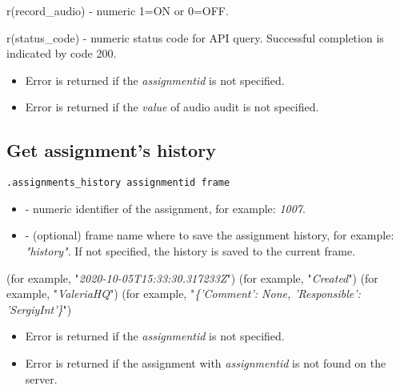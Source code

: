 \savedres
\begin{compactitem}
    \item r(record\_audio) - numeric 1=ON or 0=OFF.
    \item r(status\_code)  - numeric status code for API query. Successful completion is indicated by code 200.
\end{compactitem}

\errheader
\begin{itemize}
    \item Error  is returned if the \textit{assignmentid} is not specified.
    \item Error  is returned if the \textit{value} of audio audit is not specified.
\end{itemize}

\subsection{Get assignment's history}

\begin{lstlisting}[style=CommandLineStyle]
.assignments_history assignmentid frame
\end{lstlisting}

\paramsheader
\begin{itemize}
    \item {} - numeric identifier of the assignment, for example: \textit{1007}.
    \item {} - (optional) frame name where to save the assignment history, for example: \textit{"history"}. If not specified, the history is saved to the current frame.

\end{itemize}


\begin{compactitem}
     (for example, "\textit{2020-10-05T15:33:30.317233Z}")
     (for example, "\textit{Created}")
     (for example, "\textit{ValeriaHQ}")
     (for example, "\textit{\{'Comment': None, 'Responsible': 'SergiyInt'\}}")
\end{compactitem}

\errheader
\begin{itemize}
    \item Error  is returned if the \textit{assignmentid} is not specified.
    \item Error  is returned if the assignment with \textit{assignmentid} is not found on the server.
\end{itemize}


